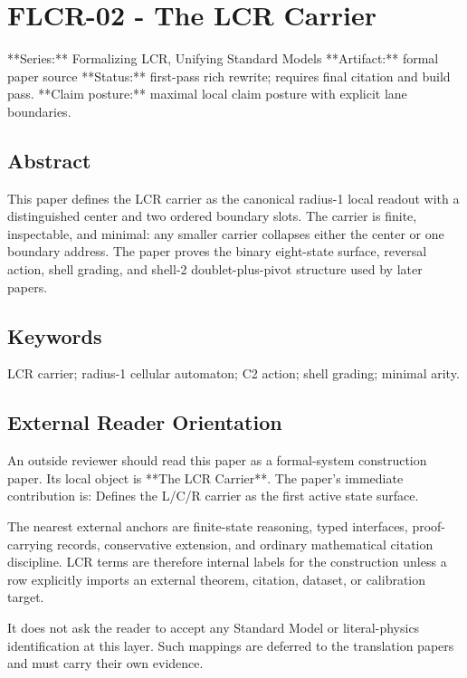 \documentclass[11pt]{article}
\begin{document}
\section*{FLCR-02 - The LCR Carrier}

**Series:** Formalizing LCR, Unifying Standard Models
**Artifact:** formal paper source
**Status:** first-pass rich rewrite; requires final citation and build pass.
**Claim posture:** maximal local claim posture with explicit lane boundaries.

\subsection*{Abstract}

This paper defines the LCR carrier as the canonical radius-1 local readout with a distinguished center and two ordered boundary slots. The carrier is finite, inspectable, and minimal: any smaller carrier collapses either the center or one boundary address. The paper proves the binary eight-state surface, reversal action, shell grading, and shell-2 doublet-plus-pivot structure used by later papers.

\subsection*{Keywords}

LCR carrier; radius-1 cellular automaton; C2 action; shell grading; minimal arity.

\subsection*{External Reader Orientation}

An outside reviewer should read this paper as a formal-system construction paper. Its local object is **The LCR Carrier**. The paper's immediate contribution is: Defines the L/C/R carrier as the first active state surface.

The nearest external anchors are finite-state reasoning, typed interfaces, proof-carrying records, conservative extension, and ordinary mathematical citation discipline. LCR terms are therefore internal labels for the construction unless a row explicitly imports an external theorem, citation, dataset, or calibration target.

It does not ask the reader to accept any Standard Model or literal-physics identification at this layer. Such mappings are deferred to the translation papers and must carry their own evidence.
\end{document}
